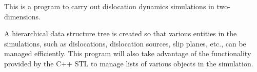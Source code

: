 This is a program to carry out dislocation dynamics simulations in two-\/dimensions.

A hierarchical data structure tree is created so that various entities in the simulations, such as dislocations, dislocation sources, slip planes, etc., can be managed efficiently. This program will also take advantage of the functionality provided by the C++ S\-T\-L to manage lists of various objects in the simulation. 